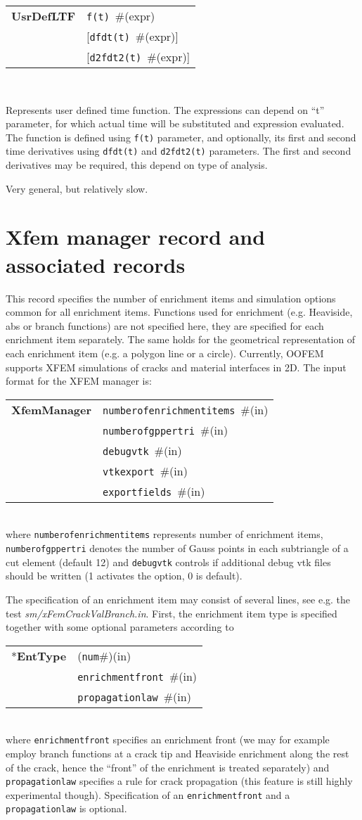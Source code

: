 \documentclass[a4paper]{report}
\newcommand{\param}[1]{\texttt{#1}} %
\newcommand{\optional}[1]{[#1]} %
\newcommand{\field}[2]{\param{#1}~\#{\tiny(#2)}} %
\newcommand{\optField}[2]{\optional{\field{#1}{#2}}}
\newcommand{\componentNum}{(\param{num}\#){\tiny(in)}} %
\newcommand{\entKeyword}[1]{*\textbf{#1}} %
\newcommand{\entKeywordInst}[1]{\textbf{#1}} %
\newenvironment{record}[1][]{\begin{tabular}{|ll}}{\end{tabular}\\}
\newcommand{\recentry}[2]{{#1}&{#2}\\}
\newcounter{rcc}
\newenvironment{record}[1][\textwidth]{\setcounter{rcc}{0}\rowcolors{1}{lightgray}{lightgray}\tabularx{#1}{llR} \hline}
               {\endtabularx}
\newcommand{\recentry}[2]{\ifthenelse{\value{rcc}>0}{$\backslash$ \\}{\setcounter{rcc}{1}}{#1}&{#2}&}
\begin{document}
\begin{itemize}
\begin{record}[0.9\textwidth]
  \recentry{\entKeywordInst{UsrDefLTF}}{\field{f(t)}{expr}}
  \recentry{}{\optField{dfdt(t)}{expr}}
  \recentry{}{\optField{d2fdt2(t)}{expr}}
\end{record}

Represents user defined time function.
The expressions can depend on ``t'' parameter, for which actual time will be substituted and
expression evaluated. The function is defined using \param{f(t)} parameter, and optionally, its first and second time derivatives using \param{dfdt(t)} and \param{d2fdt2(t)} parameters.
The first and second derivatives may be required, this depend on type of analysis.

Very general, but relatively slow.
\end{itemize}

\section{Xfem manager record and associated records}
\label{_XFEMManagerRecords}
This record specifies the number of enrichment items and simulation options
common for all enrichment items. Functions used for enrichment (e.g. Heaviside,
abs or branch functions) are not specified here, they are specified for each
enrichment item separately. The same holds for the geometrical representation of
each enrichment item (e.g. a polygon line or a circle). Currently, OOFEM
supports XFEM simulations of cracks and material interfaces in 2D. The input
format for the XFEM manager is:\\
\begin{record}
  \recentry{\entKeywordInst{XfemManager}}{\field{numberofenrichmentitems}{in}}
  \recentry{}{\field{numberofgppertri}{in}}
  \recentry{}{\field{debugvtk}{in}}
  \recentry{}{\field{vtkexport}{in}}
  \recentry{}{\field{exportfields}{in}}
\end{record}
where \param{numberofenrichmentitems} represents number of enrichment items,
\param{numberofgppertri} denotes the number of Gauss points in each subtriangle
of a cut element (default 12) and \param{debugvtk} controls if additional debug
vtk files should be written (1 activates the option, 0 is default).

The specification of an enrichment item may consist of several lines, see e.g.
the test \textit{sm/xFemCrackValBranch.in}. First, the enrichment item type is
specified together with some optional parameters according to\\
\noindent
\begin{record}
  \recentry{\entKeyword{EntType}}{\componentNum}
  \recentry{}{\field{enrichmentfront}{in}}
  \recentry{}{\field{propagationlaw}{in}}
\end{record}
where \param{enrichmentfront} specifies an enrichment front (we may for example
employ branch functions at a crack tip and Heaviside enrichment along the rest
of the crack, hence the ``front'' of the enrichment is treated separately) and
\param{propagationlaw} specifies a rule for crack propagation (this feature is
still highly experimental though). Specification of an \param{enrichmentfront}
and a \param{propagationlaw} is optional.
\end{document}
